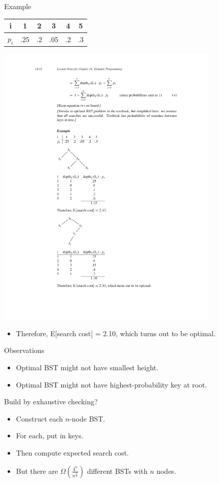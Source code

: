 \documentclass[aspectratio=169]{beamer}
\begin{document}
\begin{frame}{Example}
    \centering
    \begin{tabular}{c | c c c c c}
        i & 1 & 2 & 3 & 4 & 5 \\
        \hline
        $p_i$ & .25 & .2 & .05 & .2 & .3
    \end{tabular}
    \includegraphics[width=0.8\textwidth, trim={4cm 4cm 4cm 17cm}, clip]{figures/BST_example}
    \begin{itemize}
        \item Therefore, E[search cost] = 2.10, which turns out to be optimal.
    \end{itemize}
\end{frame}

\begin{frame}{Observations}
    \begin{itemize}
        \item Optimal BST might not have smallest height.
        \item Optimal BST might not have highest-probability key at root.
    \end{itemize}
    Build by exhaustive checking?
    \begin{itemize}
        \item Construct each $n$-node BST.
        \item For each, put in keys.
        \item Then compute expected search cost.
        \item But there are $\Omega \left( \frac{4^n}{n^{\frac{3}{2}}} \right)$ different BSTs with $n$ nodes.
    \end{itemize}
\end{frame}
\end{document}
